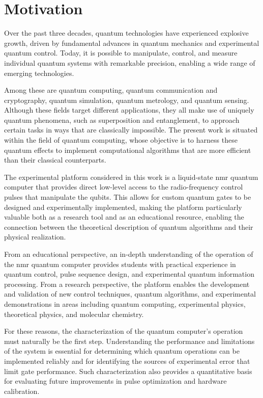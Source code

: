 \section{Motivation}

Over the past three decades, quantum technologies have experienced explosive growth, driven by fundamental advances in quantum mechanics and experimental quantum control. Today, it is possible to manipulate, control, and measure individual quantum systems with remarkable precision, enabling a wide range of emerging technologies.

Among these are quantum computing, quantum communication and cryptography, quantum simulation, quantum metrology, and quantum sensing. Although these fields target different applications, they all make use of uniquely quantum phenomena, such as superposition and entanglement, to approach certain tasks in ways that are classically impossible. The present work is situated within the field of quantum computing, whose objective is to harness these quantum effects to implement computational algorithms that are more efficient than their classical counterparts.

The experimental platform considered in this work is a liquid-state \ac{nmr} quantum computer that provides direct low-level access to the radio-frequency control pulses that manipulate the qubits. This allows for custom quantum gates to be designed and experimentally implemented, making the platform particularly valuable both as a research tool and as an educational resource, enabling the connection between the theoretical description of quantum algorithms and their physical realization.

From an educational perspective, an in-depth understanding of the operation of the \ac{nmr} quantum computer provides students with practical experience in quantum control, pulse sequence design, and experimental quantum information processing. From a research perspective, the platform enables the development and validation of new control techniques, quantum algorithms, and experimental demonstrations in areas including quantum computing, experimental physics, theoretical physics, and molecular chemistry.

For these reasons, the characterization of the quantum computer’s operation must naturally be the first step. Understanding the performance and limitations of the system is essential for determining which quantum operations can be implemented reliably and for identifying the sources of experimental error that limit gate performance. Such characterization also provides a quantitative basis for evaluating future improvements in pulse optimization and hardware calibration.

